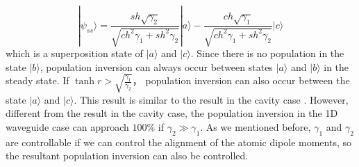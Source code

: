 \documentclass[aps,showpacs,twocolumn,twoside,groupedaddress]{revtex4}
\begin{document}
\begin{equation}
|\psi_{ss}\rangle=\frac{sh\sqrt{\gamma_{2}}}{\sqrt{ch^{2}\gamma_{1}+sh^{2}\gamma_{2}}}|a\rangle-\frac{ch\sqrt{\gamma_{1}}}{\sqrt{ch^{2}\gamma_{1}+sh^{2}\gamma_{2}}}|c\rangle
\end{equation}
which is a superposition state of $|a\rangle$ and $|c\rangle$. Since there is no population in the state $|b\rangle$,  population inversion can always occur between states $|a\rangle$ and $|b\rangle$ in the steady state. If $\tanh r>\sqrt{\frac{\gamma_{1}}{\gamma_{2}}}$， population inversion can also occur between the state $|a\rangle$ and $|c\rangle$. This  result is similar to the result in the cavity case \cite{ficek1991three}. However, different from the result in the cavity case, the population inversion in the 1D waveguide case can approach $100\%$ if $\gamma_2\gg\gamma_1$.  As we mentioned before, $\gamma_1$ and $\gamma_2$ are controllable if we can control the alignment of the atomic dipole moments, so the resultant population inversion can also be controlled.
\end{document}
